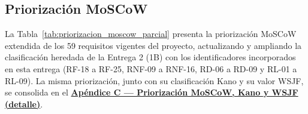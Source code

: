 \documentclass[journal,onecolumn]{IEEEtran}
\begin{document}
	\newpage
	
	\subsection{Priorización MoSCoW}
	\label{sec:moscow}
	
	La Tabla~\ref{tab:priorizacion_moscow_parcial} presenta la priorización
	MoSCoW extendida de los 59 requisitos vigentes del proyecto, actualizando y
	ampliando la clasificación heredada de la Entrega 2 (1B) con los
	identificadores incorporados en esta entrega (RF-18 a RF-25, RNF-09 a
	RNF-16, RD-06 a RD-09 y RL-01 a RL-09). La misma priorización, junto con su
	clasificación Kano y su valor WSJF, se consolida en el
	\textbf{\hyperref[tab:priorizacion_moscow_completa]{Apéndice C --- Priorización
			MoSCoW, Kano y WSJF (detalle)}}.
	
\end{document}
